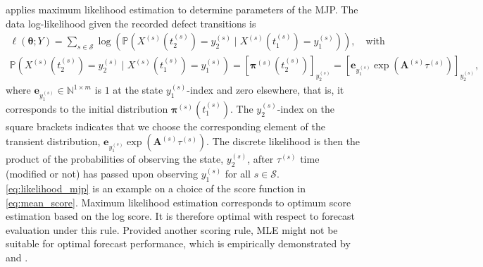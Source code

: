 \documentclass{article}
\begin{document}
\citet{bisgaard2024A} applies maximum likelihood estimation to determine parameters of the MJP.
The data log-likelihood given the recorded defect transitions is 
\begin{equation}
\begin{aligned}
                  \ell\left( \bm{\theta}; Y \right) = 
                  \sum_{s \in \mathcal{S}} \log \left( \mathds{P}\left(X^{(s)}(t_2^{(s)}) = y_2^{(s)} \mid X^{(s)}(t_1^{(s)}) = y_1^{(s)} \right) \right), \quad \text{with} \\ 
                 \mathds{P}\left(X^{(s)}(t_2^{(s)}) = y_2^{(s)} \mid X^{(s)}(t_1^{(s)}) = y_1^{(s)} \right) = \left[ \bm{\pi}^{(s)}\left( t_2^{(s)} \right)  \right]_{ y_2^{(s)}} =  \left[ \bm{e}_{y_{1}^{(s)}}  \exp \left( \bm{A}^{(s)} \tau^{(s)} \right) \right]_{ y_2^{(s)}},
                  \label{eq:likelihood_mjp}
\end{aligned}     
\end{equation}
where $\bm{e}_{y_{1}^{(s)}} \in \mathbb{N}^{1 \times m}$ is $1$ at the state $y_{1}^{(s)}$-index and zero elsewhere, that is, it corresponds to the initial distribution $\bm{\pi}^{(s)}(t_1^{(s)})$. The $y_2^{(s)}$-index on the square brackets indicates that we choose the corresponding element of the transient distribution, $\bm{e}_{y_{1}^{(s)}}  \exp \left( \bm{A}^{(s)} \tau^{(s)} \right)$. 
The discrete likelihood is then the product of the probabilities of observing the state, $y_2^{(s)}$, after $\tau^{(s)}$ time (modified or not) has passed upon observing $y_1^{(s)}$ for all $s \in \mathcal{S}$.
\cref{eq:likelihood_mjp} is an example on a choice of the score function in \cref{eq:mean_score}.
Maximum likelihood estimation corresponds to optimum score estimation based on the log score. It is therefore optimal with respect to forecast evaluation under this rule. Provided another scoring rule, MLE might not be suitable for optimal forecast performance, which is empirically demonstrated by \citet{Gneiting2005} and \citet{gebetsberger2018a}.
\end{document}
